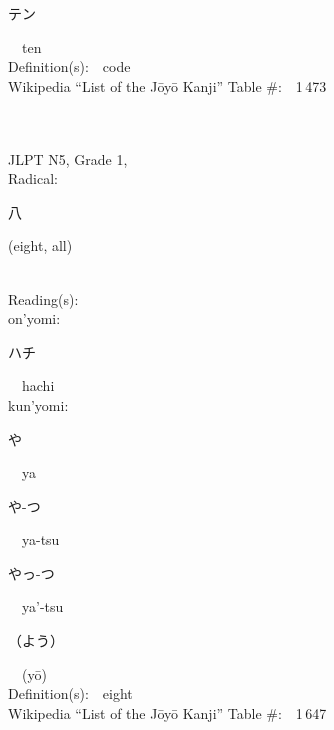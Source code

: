 \begin{multicols}{2}
{\hspace*{2em}}{\begin{CJK}{UTF8}{min} テン \end{CJK}}\ \ ten\ \ \\
Definition(s):\ \ code \\
Wikipedia ``List of the J\=oy\=o Kanji'' Table \#:\ \ 1\,473 \\
\ \ \\
{\fontsize{34pt}{40pt}  }\ \ \\  %
{JLPT N5, Grade 1, \\Radical:\ \ {\begin{CJK}{UTF8}{min} 八 \end{CJK}} (eight, all) } \\
Reading(s):\ \ \\
{\hspace*{1em}}on'yomi:\ \ \\
{\hspace*{2em}}{\begin{CJK}{UTF8}{min} ハチ \end{CJK}}\ \ hachi\ \ \\
{\hspace*{1em}}kun'yomi:\ \ \\
{\hspace*{2em}}{\begin{CJK}{UTF8}{min} や \end{CJK}}\ \ ya\ \ \\
{\hspace*{2em}}{\begin{CJK}{UTF8}{min} や-つ \end{CJK}}\ \ ya-tsu\ \ \\
{\hspace*{2em}}{\begin{CJK}{UTF8}{min} やっ-つ \end{CJK}}\ \ ya'-tsu\ \ \\
{\hspace*{2em}}{\begin{CJK}{UTF8}{min} （よう） \end{CJK}}\ \ (y\=o)\ \ \\
Definition(s):\ \ eight \\
Wikipedia ``List of the J\=oy\=o Kanji'' Table \#:\ \ 1\,647 \\
\ \ \\

\end{multicols}

